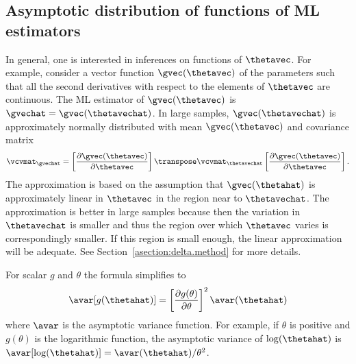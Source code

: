 \subsection{Asymptotic distribution of functions of ML estimators}
\label{asection:asymptotic.theory.fmle}
In general, one is interested in inferences on functions
of $\thetavec$. For example, consider a vector
function $\gvec(\thetavec)$ of the parameters such
that all the second derivatives
with respect to the elements of $\thetavec$ are continuous.
The ML estimator
of $\gvec(\thetavec)$ is $\gvechat=\gvec(\thetavechat)$.
In large
samples, $\gvec(\thetavechat)$
is approximately
normally distributed with mean $\gvec(\thetavec)$
and covariance matrix
\begin{equation} 
\label{equation:gcovariance}
 	\vcvmat_{\gvechat}=
	\left [\frac{\partial \gvec(\thetavec)}{\partial \thetavec }
 	\right ] \transpose
 	\vcvmat_{\thetavechat}
	\left [\frac{\partial \gvec(\thetavec)}{\partial \thetavec } \right ].
\end{equation}
The approximation is based on the assumption that $\gvec(\thetahat)$
is approximately linear in $\thetavec$ in the region near to
$\thetavechat$. The approximation is better in large samples because
then the variation in $\thetavechat$ is smaller and thus the region over
which $\thetavec$ varies is correspondingly smaller. If this region is
small enough, the linear approximation will be adequate.  See
Section~\ref{asection:delta.method} for more details.

For scalar $g$ and $\theta$ the formula simplifies to
\begin{displaymath}
\avar[g(\thetahat)]
=\left [\frac{\partial g(\theta)}{\partial \theta}
 \right ] ^{2}
 \avar(\thetahat)
\end{displaymath}
where $\avar$ is the asymptotic variance function.
For example, if $\theta$ is positive and $g(\theta)$ is the
{\rm logarithmic} function, the asymptotic variance of
$\log(\thetahat)$ is
$\avar[\log(\thetahat)]=\avar(\thetahat)/\theta^{2}$.


